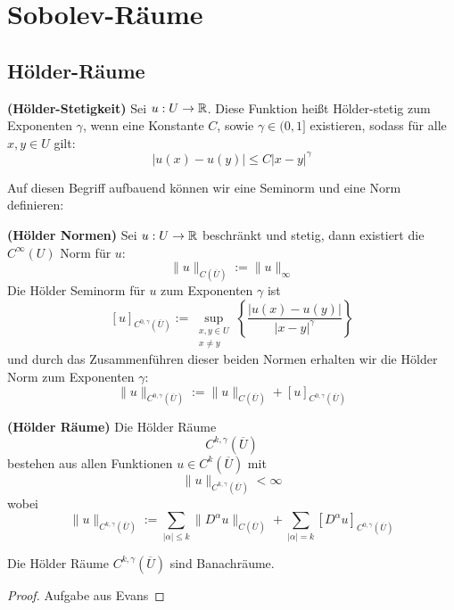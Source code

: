 
\chapter{Sobolev-Räume}
\section{Hölder-Räume}

\begin{definition} \textbf{(Hölder-Stetigkeit)}\enter
	Sei $u:U\rightarrow\mathbb{R}$. Diese Funktion heißt Hölder-stetig zum Exponenten $\gamma$, wenn eine Konstante $C$, sowie $\gamma\in(0,1]$ existieren, sodass für alle $x,y\in U$ gilt:
	\[|u(x)-u(y)| \leq C|x-y|^\gamma\]
\end{definition}

 Auf diesen Begriff aufbauend können wir eine Seminorm und eine Norm definieren:

 \begin{definition} \textbf{(Hölder Normen)}\enter
	 Sei $u:U\rightarrow\mathbb{R}$ beschränkt und stetig, dann existiert die $C^\infty(U)$ Norm für $u$:
	 \[\|u\|_{C(\overline{U})}:=\|u\|_\infty\]
	 Die Hölder Seminorm für $u$ zum Exponenten $\gamma$ ist
	 \[\left[u\right]_{C^{0,\gamma}(\overline{U})}:=
	 \sup\limits_{\substack{x,y\in U \\ x\neq y}}\left\{ \frac{|u(x)-u(y)|}{|x-y|^\gamma}\right\}\]
	und durch das Zusammenführen dieser beiden Normen erhalten wir die Hölder Norm zum Exponenten $\gamma$:
	\[\|u\|_{C^{0,\gamma}(\overline{U})}:=\|u\|_{C(\overline{U})}+\left[u\right]_{C^{0,\gamma}(\overline{U})}\]
\end{definition}

\begin{definition}\textbf{(Hölder Räume)}\enter
	Die Hölder Räume 
	\[C^{k,\gamma}(\overline{U})\]
	bestehen aus allen Funktionen $u\in C^k(\overline{U})$ mit
	\[\|u\|_{C^{k,\gamma}(\overline{U})}<\infty\]
	wobei
	\[\|u\|_{C^{k,\gamma}(\overline{U})}:=
		\sum\limits_{|\alpha|\leq k}\|D^\alpha u\|_{C(\overline{U})}
	+\sum\limits_{|\alpha|=k}\left[D^\alpha u\right]_{C^{0,\gamma}(\overline{U})}\]
\end{definition}

\begin{satz}
	Die Hölder Räume $C^{k,\gamma}(\overline{U})$ sind Banachräume.
\end{satz}
\begin{proof}
	Aufgabe aus Evans
\end{proof}

